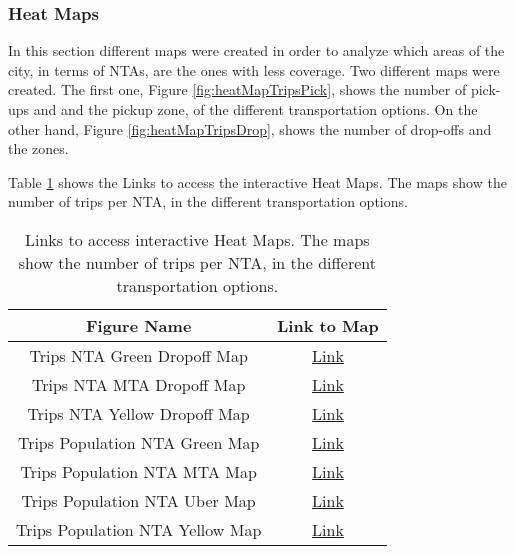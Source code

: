 \subsubsection{Heat Maps}

In this section different maps were created in order to analyze which areas of the city, in terms of NTAs, are the ones with less coverage. Two different maps were created. The first one, Figure \ref{fig:heatMapTripsPick}, shows the number of pick-ups and and the pickup zone, of the different transportation options. On the other hand, Figure \ref{fig:heatMapTripsDrop}, shows the number of drop-offs and the zones.

Table \ref{tab:dataset} shows the Links to access the interactive Heat Maps. The maps show the number of trips per NTA, in the different transportation options.

\begin{table}[h]
\begin{center}
\label{tab:dataset}
\begin{tabular}{|c|c|}
\hline
\textbf{Figure Name}     & \textbf{Link to Map}  \\ 
\hline
Trips NTA Green Dropoff Map     & \href{https://marioceron-case-51.s3.amazonaws.com/datathon_html/trips_nta_green_dropoff_map.html}{Link}   \\
Trips NTA MTA Dropoff Map       & \href{https://marioceron-case-51.s3.amazonaws.com/datathon_html/trips_nta_mta_dropoff_map.html}{Link}   \\
Trips NTA Yellow Dropoff Map    & \href{https://marioceron-case-51.s3.amazonaws.com/datathon_html/trips_nta_yellow_dropoff_map.html}{Link}  \\
Trips Population NTA Green Map  & \href{https://marioceron-case-51.s3.amazonaws.com/datathon_html/trips_pop_nta_green_map.html}{Link}      \\
Trips Population NTA MTA Map    & \href{https://marioceron-case-51.s3.amazonaws.com/datathon_html/trips_pop_nta_mta_map.html}{Link}       \\
Trips Population NTA Uber Map  & \href{https://marioceron-case-51.s3.amazonaws.com/datathon_html/trips_pop_nta_uber_map.html}{Link}      \\
Trips Population NTA Yellow Map & \href{https://marioceron-case-51.s3.amazonaws.com/datathon_html/trips_pop_nta_yellow_map.html}{Link}\\
 \hline
\end{tabular}
 \caption{Links to access interactive Heat Maps. The maps show the number of trips per NTA, in the different transportation options.}
\end{center}
\end{table}



